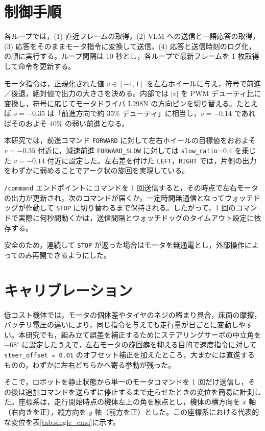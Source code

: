 \documentclass[a4paper,11pt]{ltjsreport}
\begin{document}
\section{制御手順}
各ループでは，(1) 直近フレームの取得，(2) VLM への送信と一語応答の取得，(3) 応答をそのままモータ指令に変換して送信，(4) 応答と送信時刻のログ化，の順に実行する。ループ間隔は 10 秒とし，各ループで最新フレームを 1 枚取得して命令を更新する。

モータ指令は，正規化された値 $v\in[-1,1]$ を左右ホイールに与え，符号で前進／後退，絶対値で出力の大きさを決める。内部では $\lvert v\rvert$ を PWM デューティ比に変換し，符号に応じてモータドライバ L298N の方向ピンを切り替える。たとえば $v=-0.35$ は「前進方向で約 35\% デューティ」に相当し，$v=-0.14$ であればそのおよそ 40\% の弱い前進となる。

本研究では，前進コマンド \texttt{FORWARD} に対して左右ホイールの目標値をおおよそ $v=-0.35$ 付近に，減速前進 \texttt{FORWARD\_SLOW} に対しては \texttt{slow\_ratio}=0.4 を乗じた $v=-0.14$ 付近に設定した。左右差を付けた \texttt{LEFT}，\texttt{RIGHT} では，片側の出力をわずかに弱めることでアーク状の旋回を実現している。

\texttt{/command} エンドポイントにコマンドを 1 回送信すると，その時点で左右モータの出力が更新され，次のコマンドが届くか，一定時間無通信となってウォッチドッグが作動して \texttt{STOP} に切り替わるまで保持される。したがって，1 回のコマンドで実際に何秒間動くかは，送信間隔とウォッチドッグのタイムアウト設定に依存する。

安全のため，連続して \texttt{STOP} が返った場合はモータを無通電とし，外部操作によってのみ再開できるようにした。

\section{キャリブレーション}
低コスト機体では，モータの個体差やタイヤのネジの締まり具合，床面の摩擦，バッテリ電圧の違いにより，同じ指令を与えても走行量が日ごとに変動しやすい。本研究でも，組み立て誤差を補正するためにステアリングサーボの中立角を \(-68^\circ\) に設定したうえで，左右モータの旋回癖を抑える目的で速度指令に対して \texttt{steer\_offset = 0.01} のオフセット補正を加えたところ，大まかには直進するものの，わずかに左右どちらかへ寄る挙動が残った。

そこで，ロボットを静止状態から単一のモータコマンドを 1 回だけ送信し，その後は追加コマンドを送らずに停止するまで走らせたときの変位を簡易に計測した。座標系は，走行開始時点の機体左上の角を原点とし，機体の横方向を $x$ 軸（右向きを正），縦方向を $y$ 軸（前方を正）とした。この座標系における代表的な変位を表\ref{tab:single_cmd}に示す。
\end{document}
